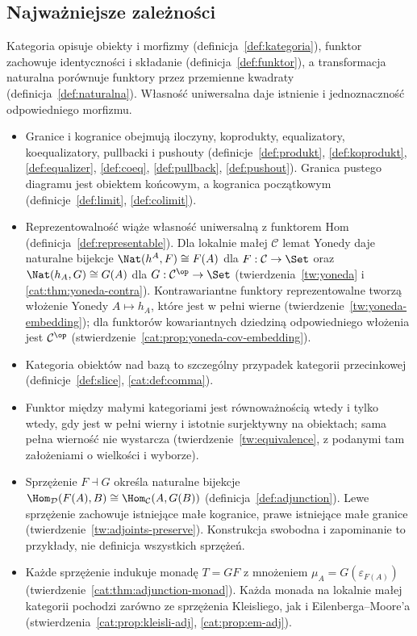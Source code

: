 \subsection{Najważniejsze zależności}\label{cat:sec:summary-dependencies}

Kategoria opisuje obiekty i morfizmy (definicja~\ref{def:kategoria}), funktor zachowuje identyczności i składanie (definicja~\ref{def:funktor}), a transformacja naturalna porównuje funktory przez przemienne kwadraty (definicja~\ref{def:naturalna}). Własność uniwersalna daje istnienie i jednoznaczność odpowiedniego morfizmu.

\begin{itemize}
\item Granice i kogranice obejmują iloczyny, koprodukty, equalizatory, koequalizatory, pullbacki i pushouty (definicje~\ref{def:produkt}, \ref{def:koprodukt}, \ref{def:equalizer}, \ref{def:coeq}, \ref{def:pullback}, \ref{def:pushout}). Granica pustego diagramu jest obiektem końcowym, a kogranica początkowym (definicje~\ref{def:limit}, \ref{def:colimit}).
\item Reprezentowalność wiąże własność uniwersalną z funktorem Hom (definicja~\ref{def:representable}). Dla lokalnie małej $\mathcal C$ lemat Yonedy daje naturalne bijekcje $\Nat(h^A,F)\cong F(A)$ dla $F:\mathcal C\to\Set$ oraz $\Nat(h_A,G)\cong G(A)$ dla $G:\mathcal C^{\op}\to\Set$ (twierdzenia~\ref{tw:yoneda} i \ref{cat:thm:yoneda-contra}). Kontrawariantne funktory reprezentowalne tworzą włożenie Yonedy $A\mapsto h_A$, które jest w pełni wierne (twierdzenie~\ref{tw:yoneda-embedding}); dla funktorów kowariantnych dziedziną odpowiedniego włożenia jest $\mathcal C^{\op}$ (stwierdzenie~\ref{cat:prop:yoneda-cov-embedding}).
\item Kategoria obiektów nad bazą to szczególny przypadek kategorii przecinkowej (definicje~\ref{def:slice}, \ref{cat:def:comma}).
\item Funktor między małymi kategoriami jest równoważnością wtedy i tylko wtedy, gdy jest w pełni wierny i istotnie surjektywny na obiektach; sama pełna wierność nie wystarcza (twierdzenie~\ref{tw:equivalence}, z podanymi tam założeniami o wielkości i wyborze).
\item Sprzężenie $F\dashv G$ określa naturalne bijekcje $\Hom_{\mathcal D}(F(A),B)\cong\Hom_{\mathcal C}(A,G(B))$ (definicja~\ref{def:adjunction}). Lewe sprzężenie zachowuje istniejące małe kogranice, prawe istniejące małe granice (twierdzenie~\ref{tw:adjoints-preserve}). Konstrukcja swobodna i zapominanie to przykłady, nie definicja wszystkich sprzężeń.
\item Każde sprzężenie indukuje monadę $T=GF$ z mnożeniem $\mu_A=G(\varepsilon_{F(A)})$ (twierdzenie~\ref{cat:thm:adjunction-monad}). Każda monada na lokalnie małej kategorii pochodzi zarówno ze sprzężenia Kleisliego, jak i Eilenberga--Moore'a (stwierdzenia~\ref{cat:prop:kleisli-adj}, \ref{cat:prop:em-adj}).
\end{itemize}

